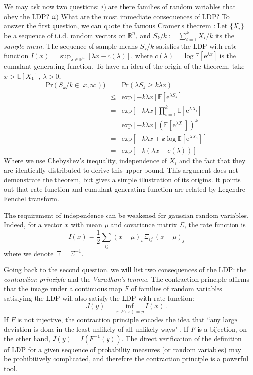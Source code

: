 \documentclass[twocolumn,aps,reprint, nofootinbib]{revtex4}
\newcommand{\e}{{\mathrm{e}}}
\begin{document}
We may ask now two questions: $i)$ are there families of random variables that obey the LDP? $ii)$ What are the most immediate consequences of LDP? To answer the first question, we can quote the famous Cramer's theorem \cite{ellis}: Let $\{ X_i \}$ be a sequence of i.i.d. random vectors on $\mathbb{R}^n$, and $S_k/k := \sum_{i=1}^k X_i/k$ its the \emph{sample mean}. The sequence of sample means $S_k/k$ satisfies the LDP with rate function $I(x) = \sup_{\lambda \in \mathbb{R}^n} [\lambda x - c(\lambda)]$, where $c(\lambda) = \log \mathbb{E}[ \e^{\lambda x}]$ is the cumulant generating function. To have an idea of the origin of the theorem, take $x > \mathbb{E}[X_1]$, $\lambda > 0$,
\begin{eqnarray}
\mathrm{Pr}(S_k/k \in [x, \infty)) & = & \mathrm{Pr}(\lambda S_k \geq k \lambda x)  \nonumber\\
& \leq & \mathrm{exp}[-k \lambda x] \mathbb{E}[ \mathrm{e}^{\lambda S_k}] \nonumber\\
& = & \mathrm{exp}[-k \lambda x] \prod_{i=1}^k \mathbb{E}[ \mathrm{e}^{\lambda X_i}] \nonumber\\
& = & \mathrm{exp}[-k \lambda x] \left(\mathbb{E}[ \mathrm{e}^{\lambda X_1}] \right)^k \nonumber\\
& = &  \mathrm{exp}[-k \lambda x + k \log \mathbb{E}[\mathrm{e}^{\lambda X_1}] ] \nonumber\\
& =& \mathrm{exp}[-k( \lambda x - c(\lambda))]
\end{eqnarray}
Where we use Chebyshev's inequality, independence of $X_i$ and the fact that they are identically distributed to derive this upper bound. This argument does not demonstrate the theorem, but gives a simple illustration of its origins. It points out that rate function and cumulant generating function are related by Legendre-Fenchel transform.

The requirement of independence can be weakened for gaussian random variables. Indeed, for a vector $x$ with mean $\mu$ and covariance matrix $\Sigma$, the rate function is
\begin{equation}
\label{rate_gauss}
I(x) = \frac{1}{2} \sum_{ij} (x - \mu)_i \, \Xi_{ij} \, (x - \mu)_j
\end{equation}
where we denote $\Xi = \Sigma^{-1}$.

Going back to the second question, we will list two consequences of the LDP: the \emph{contraction principle} and the \emph{Varadhan's lemma}. The contraction principle affirms that the image under a continuous map $F$ of families of random variables satisfying the LDP will also satisfy the LDP with rate function:
\begin{equation}
\label{rates_contraction}
J(y) = \inf_{x:F(x) = y} I(x) \, .
\end{equation}
If $F$ is not injective, the contraction principle encodes the  idea that ``any large deviation is done in the least unlikely of all unlikely ways" \cite{der_hollander}. If $F$ is a bijection, on the other hand, $J(y) = I(F^{-1}(y))$. The direct verification of the definition of LDP for a given sequence of probability measures (or random variables) may be prohibitively complicated, and therefore the contraction principle is a powerful tool.
\end{document}
